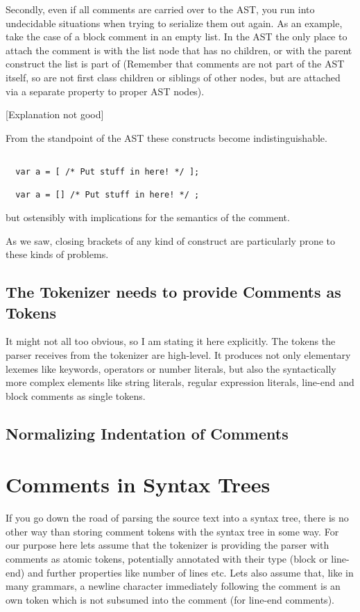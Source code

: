 \documentclass[11pt,a4paper]{article}
\begin{document}
Secondly, even if all comments are carried over to the AST, you run into
undecidable situations when trying to serialize them out again. As an example,
take the case of a block comment in an empty list. In the AST the only place to
attach the comment is with the list node that has no children, or with the
parent construct the list is part of (Remember that
comments are not part of the AST itself, so are not first class children or
siblings of
other nodes,  but are attached via a separate property to proper AST nodes).

[Explanation not good]

From the standpoint of the AST these constructs become indistinguishable.

\begin{verbatim}

  var a = [ /* Put stuff in here! */ ];

  var a = [] /* Put stuff in here! */ ;

\end{verbatim}

but ostensibly with implications for the semantics of the comment.

As we saw, closing brackets of any kind of construct are
particularly prone to these kinds of problems.


\subsection{The Tokenizer needs to provide Comments as Tokens}

It might not all too obvious, so I am stating it here explicitly. The tokens the
parser receives from the tokenizer are high-level. It produces not only
elementary lexemes like keywords, operators or number literals, but also the
syntactically more complex elements like string literals, regular expression
literals, line-end and block comments as single tokens.


\subsection{Normalizing Indentation of Comments}


\section{Comments in Syntax Trees}

If you go down the road of parsing the source text into a syntax tree, there is
no other way than storing comment tokens with the syntax tree in some way. For
our purpose here lets assume that the tokenizer is providing the parser with
comments as atomic tokens, potentially annotated with their type (block or
line-end) and further properties like number of lines etc. Lets also assume
that, like in many grammars, a newline character immediately following the
comment is an own token which is not subsumed into the comment (for line-end
comments).
\end{document}
